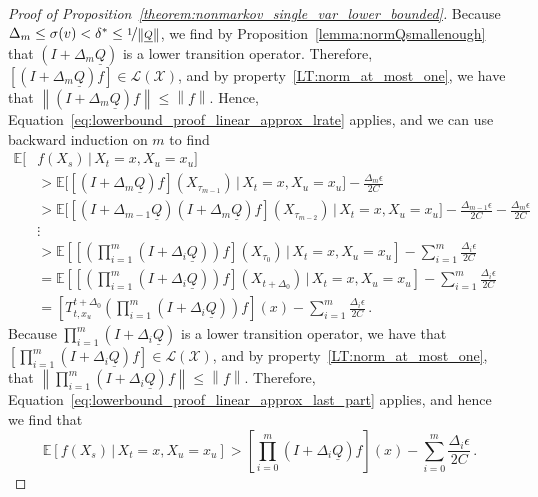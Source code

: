 \documentclass[10pt,a4paper]{paper}
\theoremstyle{definition}
\newcommand{\states}{\mathcal{X}}
\newcommand{\gambles}{\mathcal{L}}
\newcommand{\gamblesX}{\gambles(\states)}
\newcommand{\lrate}{\underline{Q}}
\newcommand{\norm}[1]{\left\lVert #1 \right\rVert}
\begin{document}
\begin{proof}[Proof of Proposition~\ref{theorem:nonmarkov_single_var_lower_bounded}]
Because $\Delta_m\leq\sigma(v)<\delta^*\leq\nicefrac{1}{\norm{\lrate}}$, we find by Proposition~\ref{lemma:normQsmallenough} that $(I+\Delta_m\lrate)$ is a lower transition operator. Therefore, $[(I+\Delta_m\lrate)f]\in\gamblesX$, and by property~\ref{LT:norm_at_most_one}, we have that $\norm{(I+\Delta_m\lrate)f}\leq\norm{f}$. Hence, Equation~\eqref{eq:lowerbound_proof_linear_approx_lrate} applies, and we can use backward induction on $m$ to find
\begin{align*}
\mathbb{E}[&f(X_s)\,\vert\,X_t=x,X_u=x_u] \\
& > \mathbb{E}\bigl[[(I+\Delta_m\lrate)f](X_{\tau_{m-1}})\,\vert\,X_t=x,X_u=x_u\bigr] - \frac{\Delta_{m}\epsilon}{2C} \\
 &> \mathbb{E}\bigl[[(I+\Delta_{m-1}\lrate)(I+\Delta_m\lrate)f](X_{\tau_{m-2}})\,\vert\,X_t=x,X_u=x_u\bigr] - \frac{\Delta_{m-1}\epsilon}{2C} - \frac{\Delta_{m}\epsilon}{2C} \\
&\vdots \\
& > \mathbb{E}\left[\left[\left(\prod_{i=1}^m(I+\Delta_i\lrate)\right)f\right](X_{\tau_{0}})\,\Bigg\vert\,X_t=x,X_u=x_u\right] - \sum_{i=1}^m\frac{\Delta_{i}\epsilon}{2C} \\
& = \mathbb{E}\left[\left[\left(\prod_{i=1}^m(I+\Delta_i\lrate)\right)f\right](X_{t+\Delta_0})\,\Bigg\vert\,X_t=x,X_u=x_u\right] - \sum_{i=1}^m\frac{\Delta_{i}\epsilon}{2C} \\
&= \left[T_{t,x_u}^{t+\Delta_0}\left(\prod_{i=1}^m(I+\Delta_i\lrate)\right)f\right](x) - \sum_{i=1}^m\frac{\Delta_{i}\epsilon}{2C}\,.
\end{align*}
Because $\prod_{i=1}^m(I+\Delta_i\lrate)$ is a lower transition operator, we have that $[\prod_{i=1}^m(I+\Delta_i\lrate)f]\in\gamblesX$, and by property~\ref{LT:norm_at_most_one}, that $\norm{\prod_{i=1}^m(I+\Delta_i\lrate)f}\leq\norm{f}$. Therefore, Equation~\eqref{eq:lowerbound_proof_linear_approx_last_part} applies, and hence we find that
\begin{equation*}
\mathbb{E}[f(X_s)\,\vert\,X_t=x,X_u=x_u] > \left[\prod_{i=0}^m(I+\Delta_i\lrate)f\right](x) - \sum_{i=0}^m\frac{\Delta_{i}\epsilon}{2C}\,.

\end{equation*}
\end{proof}
\end{document}
